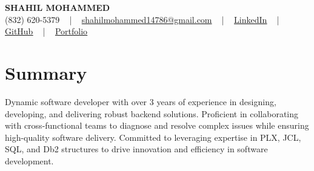\documentclass[letterpaper,10pt]{article}
\begin{document}
\begin{center}
    {\fontsize{14pt}{12pt}\selectfont \textbf{\MakeUppercase{Shahil Mohammed}}}\\ \vspace{2pt}
    \fontsize{10pt}{12pt}\selectfont (832) 620-5379 ~ | ~ \href{mailto:shahilmohammed14786@gmail.com}{shahilmohammed14786@gmail.com} ~ | ~  
    \href{https://www.linkedin.com/in/shahil-mohammed-9652931a1/}{\color{blue}\underline{LinkedIn}}  ~ | ~ 
    \href{https://github.com/freakbeast14}{\color{blue}\underline{GitHub}} ~ | ~ 
    \href{https://shahil-mohammed.netlify.app/}{\color{blue}\underline{Portfolio}}
    \vspace{-8pt}
\end{center}

\section{Summary}
\vspace{-2pt}\fontsize{8pt}{9pt}\selectfont
Dynamic software developer with over 3 years of experience in designing, developing, and delivering robust backend solutions. Proficient in collaborating with cross-functional teams to diagnose and resolve complex issues while ensuring high-quality software delivery. Committed to leveraging expertise in PLX, JCL, SQL, and Db2 structures to drive innovation and efficiency in software development.
 \vspace{-5pt}
 
\vspace{-2pt}
\end{document}
